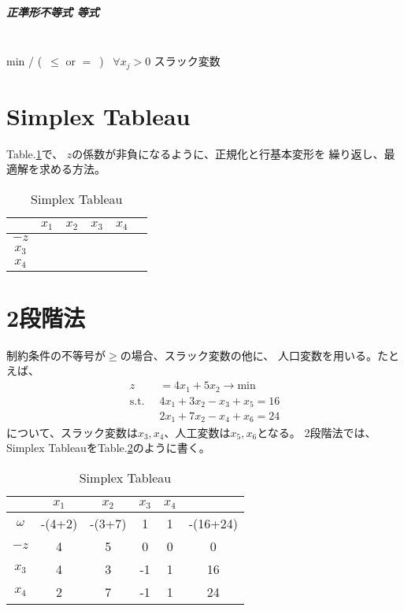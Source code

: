 \documentclass[twocolumn]{ltjsarticle}
\newcommand{\st}{
    \mathrm{s.t.}\;\;
}
\begin{document}
\subparagraph{正準形\rightarrow 不等式 \rightarrow 等式}
\leavevmode\\
min / (\ $\leq$ or $=$\ ) \rightarrow \ $\forall x_j>0$
\rightarrow スラック変数

\section{Simplex Tableau}
\noindent Table.\ref{Table_SimplexTableau}で、
$z$の係数が非負になるように、正規化と行基本変形を
繰り返し、最適解を求める方法。
\begin{table}[ht]
    \centering
    \caption{Simplex Tableau}\label{Table_SimplexTableau}
    \begin{tabular}{c|c|c|c|c|c}
         & $x_1$ & $x_2$ & $x_3$ & $x_4$ &  \\\hline
    $-z$   &      &      &      &    &   \\
    $x_3$ &      &      &      &     &   \\
    $x_4$ &      &      &      &     &   \\\hline
    \end{tabular}
\end{table}

\section{2段階法}
制約条件の不等号が$\geq$の場合、スラック変数の他に、
人口変数を用いる。たとえば、
\begin{align*}
    z&=4x_1+5x_2\rightarrow \mathrm{min}\\
    \st&4x_1+3x_2-x_3+x_5=16\\
    &2x_1+7x_2-x_4+x_6=24
\end{align*}
について、スラック変数は$x_3,x_4$、人工変数は$x_5,x_6$となる。
2段階法では、Simplex TableauをTable.\ref{Table_SimplexTableauTwo}のように書く。
\begin{table}[ht]
    \centering
    \caption{Simplex Tableau}\label{Table_SimplexTableauTwo}
    \begin{tabular}{c|c|c|c|c|c}
         & $x_1$ & $x_2$ & $x_3$ & $x_4$ & \\\hline
    $\omega$ & -(4+2) & -(3+7)  & 1 & 1 & -(16+24) \\
    $-z$   &   4   &   5   &   0   &   0   &  0\\\hline
    $x_3$ &   4   &   3   &   -1   &   1   & 16\\
    $x_4$ &   2   &    7  &    -1  &  1   & 24 \\\hline
    \end{tabular}
\end{table}
\end{document}
